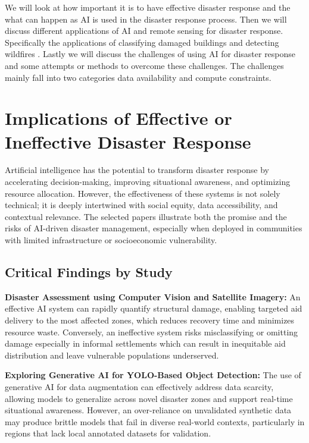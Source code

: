 \documentclass[conference,a4paper]{IEEEtran}
\begin{document}
We will look at how important it is to have effective disaster response and the what can happen as AI is used in the disaster response process. Then we will discuss different applications of AI and remote sensing for disaster response. Specifically the applications of classifying damaged buildings \cite{kimDisasterAssessmentUsing2022,teohExploringGenerativeAI2024,lagapEnhancingPostDisasterDamage2025} and detecting wildfires \cite{elbohy2025fusion,jiaoForestFirePatterns2023}. Lastly we will discuss the challenges of using AI for disaster response and some attempts or methods to overcome these challenges. The challenges mainly fall into two categories data availability and compute constraints.



\section{Implications of Effective or Ineffective Disaster Response}

Artificial intelligence has the potential to transform disaster response by accelerating decision-making, improving situational awareness, and optimizing resource allocation. However, the effectiveness of these systems is not solely technical; it is deeply intertwined with social equity, data accessibility, and contextual relevance. The selected papers illustrate both the promise and the risks of AI-driven disaster management, especially when deployed in communities with limited infrastructure or socioeconomic vulnerability.

\subsection{Critical Findings by Study}

\textbf{Disaster Assessment using Computer Vision and Satellite Imagery:}
An effective AI system can rapidly quantify structural damage, enabling targeted aid delivery to the most affected zones, which reduces recovery time and minimizes resource waste. Conversely, an ineffective system risks misclassifying or omitting damage especially in informal settlements which can result in inequitable aid distribution and leave vulnerable populations underserved.

\textbf{Exploring Generative AI for YOLO-Based Object Detection:}
The use of generative AI for data augmentation can effectively address data scarcity, allowing models to generalize across novel disaster zones and support real-time situational awareness. However, an over-reliance on unvalidated synthetic data may produce brittle models that fail in diverse real-world contexts, particularly in regions that lack local annotated datasets for validation.
\end{document}
